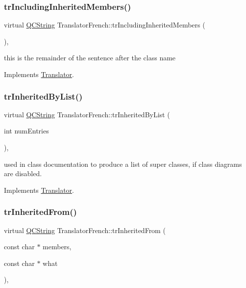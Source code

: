 \subsubsection{\texorpdfstring{trIncludingInheritedMembers()}{trIncludingInheritedMembers()}}
{\footnotesize\ttfamily virtual \mbox{\hyperlink{class_q_c_string}{Q\+C\+String}} Translator\+French\+::tr\+Including\+Inherited\+Members (\begin{DoxyParamCaption}{ }\end{DoxyParamCaption})\hspace{0.3cm}{\ttfamily [inline]}, {\ttfamily [virtual]}}

this is the remainder of the sentence after the class name 

Implements \mbox{\hyperlink{class_translator}{Translator}}.

\mbox{\label{class_translator_french_a7c965272d31e055cc1ec3be0dcb1d046}} 
\subsubsection{\texorpdfstring{trInheritedByList()}{trInheritedByList()}}
{\footnotesize\ttfamily virtual \mbox{\hyperlink{class_q_c_string}{Q\+C\+String}} Translator\+French\+::tr\+Inherited\+By\+List (\begin{DoxyParamCaption}\item[{int}]{num\+Entries }\end{DoxyParamCaption})\hspace{0.3cm}{\ttfamily [inline]}, {\ttfamily [virtual]}}

used in class documentation to produce a list of super classes, if class diagrams are disabled. 

Implements \mbox{\hyperlink{class_translator}{Translator}}.

\mbox{\label{class_translator_french_adc983f1fcbce9278e2fa1a201fa2bf23}} 
\subsubsection{\texorpdfstring{trInheritedFrom()}{trInheritedFrom()}}
{\footnotesize\ttfamily virtual \mbox{\hyperlink{class_q_c_string}{Q\+C\+String}} Translator\+French\+::tr\+Inherited\+From (\begin{DoxyParamCaption}\item[{const char $\ast$}]{members,  }\item[{const char $\ast$}]{what }\end{DoxyParamCaption})\hspace{0.3cm}{\ttfamily [inline]}, {\ttfamily [virtual]}}

